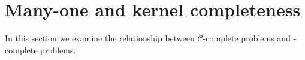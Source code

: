 \section{Many-one and kernel completeness}
\label{sec:npeqcompleteness}

In this section we examine the relationship between $\mathcal{C}$-complete problems and \CEq-complete problems.

